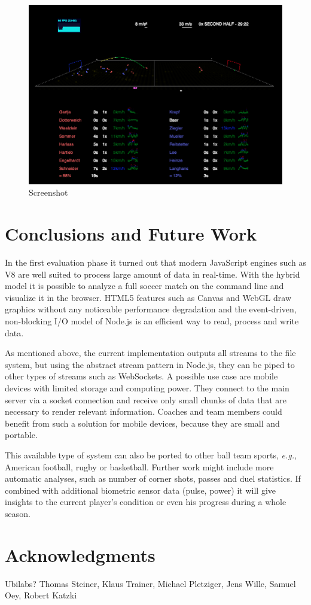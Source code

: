 \documentclass{sig-alternate}
\begin{document}
\begin{figure}[t!]
  \centering
  \includegraphics[width=\linewidth]{soccer.png}
  \caption{Screenshot}
  \label{fig:screenshot}
\end{figure}

\section{Conclusions and Future Work}
\label{sec:conclusions-future-work}

In the first evaluation phase it turned out
that modern JavaScript engines such as V8
are well suited to process large amount of data in real-time.
With the hybrid model it is possible to analyze a full soccer match
on the command line and visualize it in the browser.
HTML5 features such as Canvas and WebGL draw graphics
without any noticeable performance degradation
and the event-driven, non-blocking I/O model of Node.js
is an efficient way to read, process and write data.

As mentioned above, the current implementation
outputs all streams to the file system,
but using the abstract stream pattern in Node.js,
they can be piped to other types of streams such as WebSockets.
A possible use case are mobile devices with limited storage
and computing power.
They connect to the main server via a socket connection
and receive only small chunks of data that are necessary
to render relevant information.
Coaches and team members could benefit from such a solution
for mobile devices, because they are small and portable.

This available type of system can also be ported
to other ball team sports, \emph{e.g.}, American football,
rugby or basketball.
Further work might include more automatic analyses,
such as number of corner shots, passes and duel statistics.
If combined with additional biometric sensor data (pulse, power)
it will give insights to the current player’s condition
or even his progress during a whole season.

\section*{Acknowledgments}
Ubilabs? Thomas Steiner, Klaus Trainer, Michael Pletziger, Jens Wille, Samuel Oey, Robert Katzki



\end{document}
